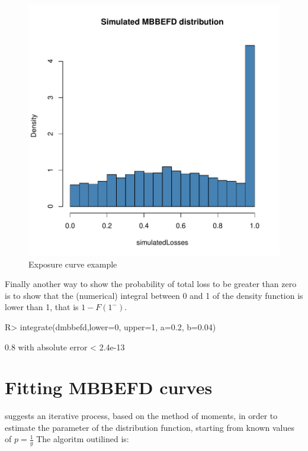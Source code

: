 \documentclass[article, nojss]{jss}
\begin{document}
\begin{figure}
\begin{center}
\includegraphics{mbbefd-distrPlot}
\caption{Exposure curve example}
\label{fig:G1}
\end{center}
\end{figure}




Finally another way to show the probability of total loss to be greater than zero is to show that the (numerical) integral between 0 and 1 of the density function is lower than 1, that is $1-F\left(1^- \right)$.

\begin{Schunk}
\begin{Sinput}
R> integrate(dmbbefd,lower=0, upper=1, a=0.2, b=0.04)
\end{Sinput}
\begin{Soutput}
0.8 with absolute error < 2.4e-13
\end{Soutput}
\end{Schunk}


\section{Fitting MBBEFD curves}\label{sec:fitting}


\cite{bernegger97} suggests an iterative process, based on the method of moments, in order to estimate the parameter of the 
distribution function, starting from known values of $p=\frac{1}{g}$ The algoritm outilined is:
\end{document}
